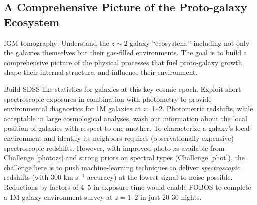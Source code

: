 
\subsection{A Comprehensive Picture of the Proto-galaxy Ecosystem}
\label{sec:galaxies}

%
%
%
%

\noindent{} IGM tomography: Understand the $z \sim
2$ galaxy ``ecosystem,'' including not only the galaxies themselves
but their gas-filled environments. The goal is to build a
comprehensive picture of the physical processes that fuel
proto-galaxy growth, shape their internal structure, and influence
their environment.

\noindent{} Build SDSS-like statistics for galaxies at
this key cosmic epoch. Exploit short spectroscopic exposures in
combination with photometry to provide environmental diagnostics for
1M galaxies at $z$=1--2. Photometric redshifts, while acceptable in
large cosmological analyses, wash out information about the local
position of galaxies with respect to one another. To characterize a
galaxy's local environment and identify its neighbors requires
(observationally expensive) spectroscopic redshifts. However, with
improved photo-$z$s available from Challenge \ref{photozs} and strong
priors on spectral types (Challenge \ref{phot}), the challenge here
is to push machine-learning techniques to deliver
\emph{spectroscopic} redshifts (with 300 km s$^{-1}$ accuracy) at the
lowest signal-to-noise possible. Reductions by factors of 4--5 in
exposure time would enable FOBOS to complete a 1M galaxy environment
survey at $z=1$--$2$ in just 20-30 nights.

\noindent{}

\noindent{}

